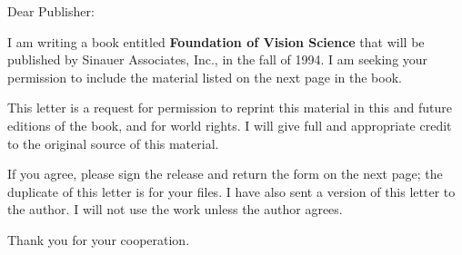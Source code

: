 

\vspace{0.9in}

\mydate

Dear Publisher:

I am writing a book entitled {\bf Foundation of Vision Science} that
will be published by Sinauer Associates, Inc., in the fall of 1994.  I
am seeking your permission to include the material listed on the next
page in the book.

This letter is a request for permission to reprint this material in
this and future editions of the book, and for world rights.  I will
give full and appropriate credit to the original source of this
material.

If you agree, please sign the release and return
the form on the next page;
the duplicate of this letter is for your files.  I 
have also sent a version of
this letter to the author.
I will not use the work unless the author agrees.

Thank you for your cooperation.


\newpage



